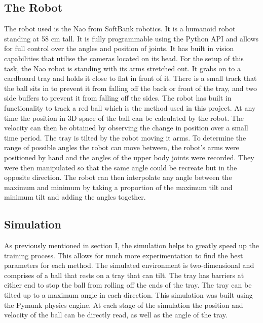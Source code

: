 \documentclass[12pt,a4paper]{article}
\begin{document}
\subsection{The Robot}
The robot used is the Nao from SoftBank robotics. It is a humanoid robot standing at 58 cm tall. It is fully programmable using the Python API and allows for full control over the angles and position of joints. It has built in vision capabilities that utilise the cameras located on its head. For the setup of this task, the Nao robot is standing with its arms stretched out. It grabs on to a cardboard tray  and holds it close to flat in front of it. There is a small track that the ball sits in to prevent it from falling off the back or front of the tray, and two side buffers to prevent it from falling off the sides. The robot has built in functionality to track a red ball which is the method used in this project. At any time the position in 3D space of the ball can be calculated by the robot. The velocity can then be obtained by observing the change in position over a small time period. The tray is tilted by the robot moving it arms. To determine the range of possible angles the robot can move between, the robot's arms were positioned by hand and the angles of the upper body joints were recorded. They were then manipulated so that the same angle could be recreate but in the opposite direction. The robot can then interpolate any angle between the maximum and minimum by taking a proportion of the maximum tilt and minimum tilt and adding the angles together.

\subsection{Simulation}
As previously mentioned in section I, the simulation helps to greatly speed up the training process. This allows for much more experimentation to find the best parameters for each method. The simulated environment is two-dimensional and comprises of a ball that rests on a tray that can tilt. The tray has barriers at either end to stop the ball from rolling off the ends of the tray. The tray can be tilted up to a maximum angle in each direction. This simulation was built using the Pymunk physics engine. At each stage of the simulation the position and velocity of the ball can be directly read, as well as the angle of the tray.  
\end{document}

